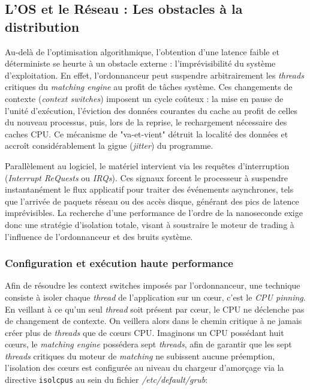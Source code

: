 \subsection{L’OS et le Réseau : Les obstacles à la distribution}

Au-delà de l'optimisation algorithmique, l'obtention d'une latence faible et déterministe se heurte à un obstacle externe : l'imprévisibilité du système d'exploitation. En effet, l'ordonnanceur peut suspendre arbitrairement les \textit{threads} critiques du \textit{matching engine} au profit de tâches système. Ces changements de contexte (\textit{context switches}) imposent un cycle coûteux : la mise en pause de l'unité d'exécution, l'éviction des données courantes du cache au profit de celles du nouveau processus, puis, lors de la reprise, le rechargement nécessaire des caches CPU. Ce mécanisme de "va-et-vient" détruit la localité des données et accroît considérablement la gigue (\textit{jitter}) du programme.

Parallèlement au logiciel, le matériel intervient via les requêtes d'interruption (\textit{Interrupt ReQuests} ou \textit{IRQs}). Ces signaux forcent le processeur à suspendre instantanément le flux applicatif pour traiter des événements asynchrones, tels que l'arrivée de paquets réseau ou des accès disque, générant des pics de latence imprévisibles. La recherche d'une performance de l'ordre de la nanoseconde exige donc une stratégie d'isolation totale, visant à soustraire le moteur de trading à l'influence de l'ordonnanceur et des bruits système.


\subsubsection{Configuration et exécution haute performance}

Afin de résoudre les context switches imposés par l'ordonnanceur, une technique consiste à isoler chaque \textit{thread} de l'application sur un cœur, c'est le \textit{CPU pinning}. En veillant à ce qu'un seul \textit{thread} soit présent par cœur, le CPU ne déclenche pas de changement de contexte. On veillera alors dans le chemin critique à ne jamais créer plus de \textit{threads} que de cœurs CPU. Imaginons un CPU possédant huit cœurs, le \textit{matching engine} possédera sept \textit{threads}, afin de garantir que les sept \textit{threads} critiques du moteur de \textit{matching} ne subissent aucune préemption, l'isolation des cœurs est configurée au niveau du chargeur d'amorçage via la directive \texttt{isolcpus} au sein du fichier \textit{/etc/default/grub}:

